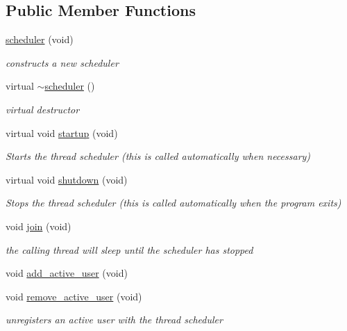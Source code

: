 \subsection*{Public Member Functions}
\begin{DoxyCompactItemize}
\item 
\hyperlink{classpion_1_1scheduler_a745efe16565852dc0b54bea88eb6d7fb}{scheduler} (void)
\begin{DoxyCompactList}\small\item\em constructs a new scheduler \end{DoxyCompactList}\item 
virtual \hyperlink{classpion_1_1scheduler_a24c6e2c943335bba6ec6d1d8dae20c0e}{$\sim$scheduler} ()
\begin{DoxyCompactList}\small\item\em virtual destructor \end{DoxyCompactList}\item 
virtual void \hyperlink{classpion_1_1scheduler_ab656139dc844a547d5c1001b3ef17d13}{startup} (void)
\begin{DoxyCompactList}\small\item\em Starts the thread scheduler (this is called automatically when necessary) \end{DoxyCompactList}\item 
virtual void \hyperlink{classpion_1_1scheduler_a54887d0e772ed9c01156a46f2d89ce93}{shutdown} (void)
\begin{DoxyCompactList}\small\item\em Stops the thread scheduler (this is called automatically when the program exits) \end{DoxyCompactList}\item 
void \hyperlink{classpion_1_1scheduler_ab9a1777f25b90f1970ea97035dd7310d}{join} (void)
\begin{DoxyCompactList}\small\item\em the calling thread will sleep until the scheduler has stopped \end{DoxyCompactList}\item 
void \hyperlink{classpion_1_1scheduler_aff5a6778a3a6174d7d684b709901d1d0}{add\-\_\-active\-\_\-user} (void)
\item 
void \hyperlink{classpion_1_1scheduler_a402e15e25d6c4b63241a636bd3ca53cf}{remove\-\_\-active\-\_\-user} (void)
\begin{DoxyCompactList}\small\item\em unregisters an active user with the thread scheduler \end{DoxyCompactList}\item 

\end{DoxyCompactItemize}

